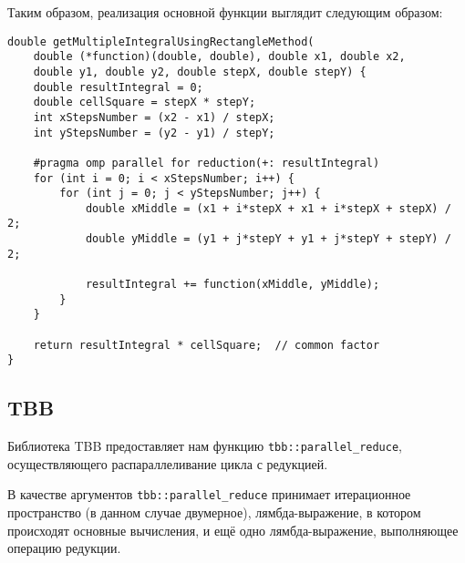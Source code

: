 \documentclass{article}
\begin{document}
\par Таким образом, реализация основной функции выглядит следующим образом:

\vspace{10pt}
\begin{lstlisting}
double getMultipleIntegralUsingRectangleMethod(
    double (*function)(double, double), double x1, double x2,
    double y1, double y2, double stepX, double stepY) {
    double resultIntegral = 0;
    double cellSquare = stepX * stepY;
    int xStepsNumber = (x2 - x1) / stepX;
    int yStepsNumber = (y2 - y1) / stepY;

    #pragma omp parallel for reduction(+: resultIntegral)
    for (int i = 0; i < xStepsNumber; i++) {
        for (int j = 0; j < yStepsNumber; j++) {
            double xMiddle = (x1 + i*stepX + x1 + i*stepX + stepX) / 2;
            double yMiddle = (y1 + j*stepY + y1 + j*stepY + stepY) / 2;

            resultIntegral += function(xMiddle, yMiddle);
        }
    }

    return resultIntegral * cellSquare;  // common factor
}
\end{lstlisting}

\newpage

\subsection{TBB}

\par Библиотека TBB предоставляет нам функцию \verb|tbb::parallel_reduce|, осуществляющего распараллеливание цикла с редукцией.

\par В качестве аргументов \verb|tbb::parallel_reduce| принимает итерационное пространство (в данном случае двумерное), лямбда-выражение, в котором происходят основные вычисления, и ещё одно лямбда-выражение, выполняющее операцию редукции.
\end{document}
